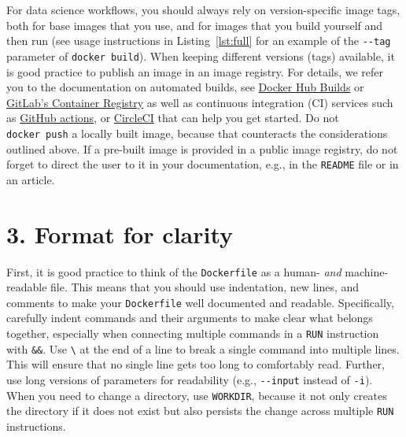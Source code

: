 \documentclass[10pt,letterpaper]{article}
\begin{document}
For data science workflows, you should always rely on version-specific
image tags, both for base images that you use, and for images that you
build yourself and then run (see usage instructions in
Listing~\ref{lst:full} for an example of the \texttt{-\/-tag} parameter
of \texttt{docker\ build}). When keeping different versions (tags)
available, it is good practice to publish an image in an image registry.
For details, we refer you to the documentation on automated builds, see
\href{https://docs.docker.com/docker-hub/builds/}{Docker Hub Builds} or
\href{https://docs.gitlab.com/ee/user/packages/container_registry/index.html\#build-and-push-images}{GitLab's
Container Registry} as well as continuous integration (CI) services such
as
\href{https://github.com/actions/starter-workflows/tree/master/ci}{GitHub
actions}, or
\href{https://circleci.com/orbs/registry/orb/circleci/docker\#commands-build}{CircleCI}
that can help you get started. Do not \texttt{docker\ push} a locally
built image, because that counteracts the considerations outlined above.
If a pre-built image is provided in a public image registry, do not
forget to direct the user to it in your documentation, e.g., in the
\texttt{README} file or in an article.

\hypertarget{format-for-clarity}{%
\section{3. Format for clarity}\label{format-for-clarity}}

  \label{rule:formatting} 
  \label{rule:clarity} 

First, it is good practice to think of the \texttt{Dockerfile} as a
human- \emph{and} machine-readable file. This means that you should use
indentation, new lines, and comments to make your \texttt{Dockerfile}
well documented and readable. Specifically, carefully indent commands
and their arguments to make clear what belongs together, especially when
connecting multiple commands in a \texttt{RUN} instruction with
\texttt{\&\&}. Use \texttt{\textbackslash{}} at the end of a line to
break a single command into multiple lines. This will ensure that no
single line gets too long to comfortably read. Further, use long
versions of parameters for readability (e.g., \texttt{-\/-input} instead
of \texttt{-i}). When you need to change a directory, use
\texttt{WORKDIR}, because it not only creates the directory if it does
not exist but also persists the change across multiple \texttt{RUN}
instructions.
\end{document}
